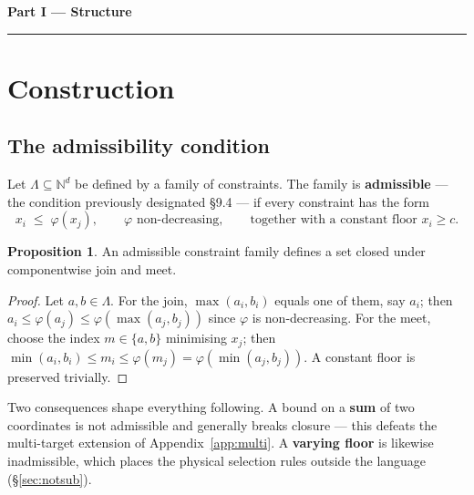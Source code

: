 \documentclass[11pt,a4paper]{article}
\newcommand{\parttitle}[1]{%
  \vspace{1.2\baselineskip}%
  {\noindent\LARGE\bfseries\color{acc} #1\par}%
  \vspace{0.4\baselineskip}\noindent\textcolor{acc}{\rule{\linewidth}{0.8pt}}%
  \vspace{0.6\baselineskip}\par}
\theoremstyle{definition}
\newtheorem{proposition}{Proposition}[section]
\newcommand{\Lm}{\ensuremath{\Lambda}}
\begin{document}
\parttitle{Part I --- Structure}

\section{Construction}

\subsection{The admissibility condition}
Let $\Lm \subseteq \mathbb{N}^{d}$ be defined by a family of constraints. The
family is \textbf{admissible} --- the condition previously designated \S9.4 ---
if every constraint has the form
\begin{equation}
x_{i} \;\le\; \varphi(x_{j}), \qquad \varphi \text{ non-decreasing},
\qquad\text{together with a constant floor } x_{i}\ge c .
\label{eq:admis}
\end{equation}

\begin{proposition}
An admissible constraint family defines a set closed under componentwise join
and meet.
\end{proposition}
\begin{proof}
Let $a,b\in\Lm$. For the join, $\max(a_i,b_i)$ equals one of them, say $a_i$;
then $a_i \le \varphi(a_j) \le \varphi(\max(a_j,b_j))$ since $\varphi$ is
non-decreasing. For the meet, choose the index $m\in\{a,b\}$ minimising $x_j$;
then $\min(a_i,b_i)\le m_i \le \varphi(m_j)=\varphi(\min(a_j,b_j))$. A constant
floor is preserved trivially.
\end{proof}

Two consequences shape everything following. A bound on a \textbf{sum} of two
coordinates is not admissible and generally breaks closure --- this defeats the
multi-target extension of Appendix~\ref{app:multi}. A \textbf{varying floor} is
likewise inadmissible, which places the physical selection rules outside the
language (\S\ref{sec:notsub}).
\end{document}
